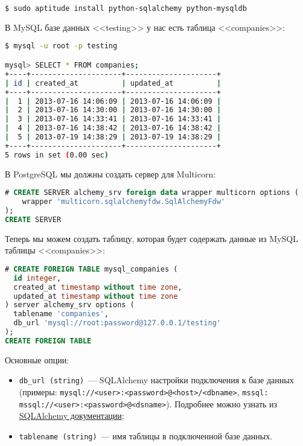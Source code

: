 \begin{lstlisting}[language=Bash,label=lst:pgmulticorn-rdbms1,caption=Multicorn]
$ sudo aptitude install python-sqlalchemy python-mysqldb
\end{lstlisting}

В MySQL базе данных <<testing>> у нас есть таблица <<companies>>:

\begin{lstlisting}[language=Bash,label=lst:pgmulticorn-rdbms2,caption=Multicorn]
$ mysql -u root -p testing

mysql> SELECT * FROM companies;
+----+---------------------+---------------------+
| id | created_at          | updated_at          |
+----+---------------------+---------------------+
|  1 | 2013-07-16 14:06:09 | 2013-07-16 14:06:09 |
|  2 | 2013-07-16 14:30:00 | 2013-07-16 14:30:00 |
|  3 | 2013-07-16 14:33:41 | 2013-07-16 14:33:41 |
|  4 | 2013-07-16 14:38:42 | 2013-07-16 14:38:42 |
|  5 | 2013-07-19 14:38:29 | 2013-07-19 14:38:29 |
+----+---------------------+---------------------+
5 rows in set (0.00 sec)
\end{lstlisting}

В PostgreSQL мы должны создать сервер для Multicorn:

\begin{lstlisting}[language=SQL,label=lst:pgmulticorn-rdbms3,caption=Multicorn]
# CREATE SERVER alchemy_srv foreign data wrapper multicorn options (
    wrapper 'multicorn.sqlalchemyfdw.SqlAlchemyFdw'
);
CREATE SERVER
\end{lstlisting}

Теперь мы можем создать таблицу, которая будет содержать данные из MySQL таблицы <<companies>>:

\begin{lstlisting}[language=SQL,label=lst:pgmulticorn-rdbms4,caption=Multicorn]
# CREATE FOREIGN TABLE mysql_companies (
  id integer,
  created_at timestamp without time zone,
  updated_at timestamp without time zone
) server alchemy_srv options (
  tablename 'companies',
  db_url 'mysql://root:password@127.0.0.1/testing'
);
CREATE FOREIGN TABLE
\end{lstlisting}

Основные опции:

\begin{itemize}
  \item \lstinline!db_url (string)!~--- SQLAlchemy настройки подключения к базе данных (примеры: \lstinline!mysql://<user>:<password>@<host>/<dbname>!, \lstinline!mssql: mssql://<user>:<password>@<dsname>!). Подробнее можно узнать из \href{http://docs.sqlalchemy.org/en/latest/dialects/}{SQLAlchemy документации};
  \item \lstinline!tablename (string)!~--- имя таблицы в подключенной базе данных.
\end{itemize}

